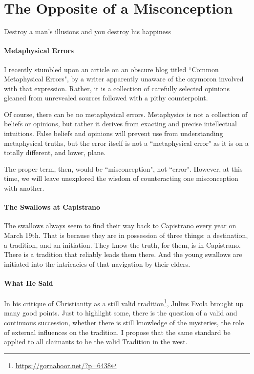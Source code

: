 \section{The Opposite of a Misconception}

\begin{quotex}
Destroy a man's illusions and you destroy his happiness 

\end{quotex}
\paragraph{Metaphysical Errors}
I recently stumbled upon an article on an obscure blog titled ``Common Metaphysical Errors", by a writer apparently unaware of the oxymoron involved with that expression. Rather, it is a collection of carefully selected opinions gleaned from unrevealed sources followed with a pithy counterpoint.

Of course, there can be no metaphysical errors. Metaphysics is not a collection of beliefs or opinions, but rather it derives from exacting and precise intellectual intuitions. False beliefs and opinions will prevent use from understanding metaphysical truths, but the error itself is not a ``metaphysical error" as it is on a totally different, and lower, plane.

The proper term, then, would be ``misconception", not ``error". However, at this time, we will leave unexplored the wisdom of counteracting one misconception with another.

\paragraph{The Swallows at Capistrano}
The swallows always seem to find their way back to Capistrano every year on March 19th. That is because they are in possession of three things: a destination, a tradition, and an initiation. They know the truth, for them, is in Capistrano. There is a tradition that reliably leads them there. And the young swallows are initiated into the intricacies of that navigation by their elders.

\paragraph{What He Said}
In his critique of Christianity as a still valid tradition\footnote{\url{https://gornahoor.net/?p=6438}}, Julius Evola brought up many good points. Just to highlight some, there is the question of a valid and continuous succession, whether there is still knowledge of the mysteries, the role of external influences on the tradition. I propose that the same standard be applied to all claimants to be the valid Tradition in the west.

